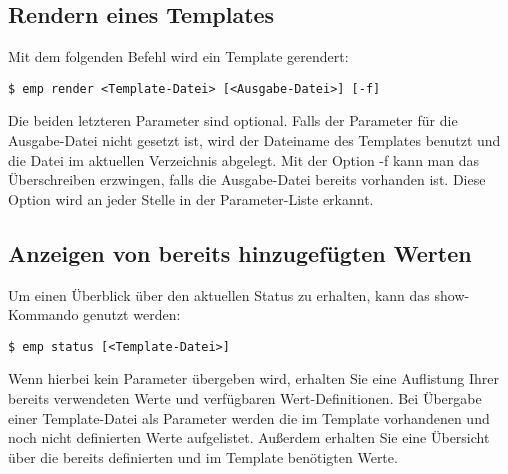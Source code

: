 \subsection{Rendern eines Templates}
Mit dem folgenden Befehl wird ein Template gerendert:
\begin{lstlisting}[style=Bash]
$ emp render <Template-Datei> [<Ausgabe-Datei>] [-f]
\end{lstlisting}

Die beiden letzteren Parameter sind optional. Falls der Parameter für die Ausgabe-Datei nicht gesetzt ist, wird der Dateiname des Templates benutzt und die Datei im aktuellen Verzeichnis abgelegt. Mit der Option -f kann man das Überschreiben erzwingen, falls die Ausgabe-Datei bereits vorhanden ist. Diese Option wird an jeder Stelle in der Parameter-Liste erkannt.

\subsection{Anzeigen von bereits hinzugefügten Werten}
Um einen Überblick über den aktuellen Status zu erhalten, kann das show-Kommando genutzt werden:
\begin{lstlisting}[style=Bash]
$ emp status [<Template-Datei>]
\end{lstlisting}
Wenn hierbei kein Parameter übergeben wird, erhalten Sie eine Auflistung Ihrer bereits verwendeten Werte und verfügbaren Wert-Definitionen.
Bei Übergabe einer Template-Datei als Parameter werden die im Template vorhandenen und noch nicht definierten Werte aufgelistet. Außerdem erhalten Sie eine Übersicht über die bereits definierten und im Template benötigten Werte.

